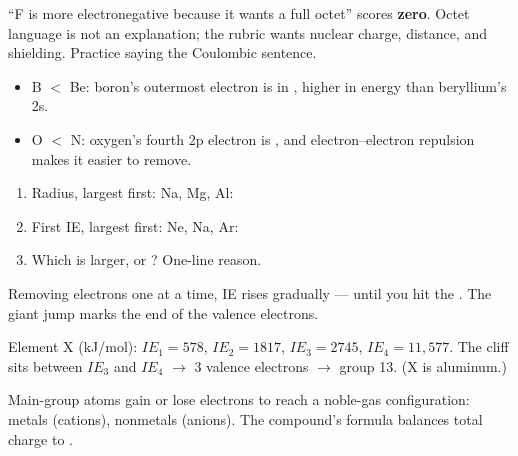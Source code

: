 \documentclass{apchem-notes}
\begin{document}
\begin{apctrap}
``F is more electronegative because it wants a full octet'' scores
\textbf{zero}. Octet language is not an explanation; the rubric wants nuclear
charge, distance, and shielding. Practice saying the Coulombic sentence.
\end{apctrap}


\begin{itemize}[leftmargin=*,itemsep=0.25em]
  \item B $<$ Be: boron's outermost electron is in ,
        higher in energy than beryllium's 2s.
  \item O $<$ N: oxygen's fourth 2p electron is ,
        and electron--electron repulsion makes it easier to remove.
\end{itemize}


\begin{enumerate}[leftmargin=*,itemsep=0.4em]
  \item Radius, largest first: Na, Mg, Al:
  \item First IE, largest first: Ne, Na, Ar:
  \item Which is larger,  or ? One-line reason.
\end{enumerate}



Removing electrons one at a time, IE rises gradually --- until you hit the
. The giant jump marks the end of the valence electrons.

\begin{workedexample}
Element X (kJ/mol): $IE_1 = 578$, $IE_2 = 1817$, $IE_3 = 2745$,
$IE_4 = 11{,}577$. The cliff sits between $IE_3$ and $IE_4$ $\to$ 3 valence
electrons $\to$ group 13. (X is aluminum.)
\end{workedexample}


Main-group atoms gain or lose electrons to reach a noble-gas configuration:
metals  (cations), nonmetals
 (anions). The compound's formula balances total
charge to .
\end{document}

